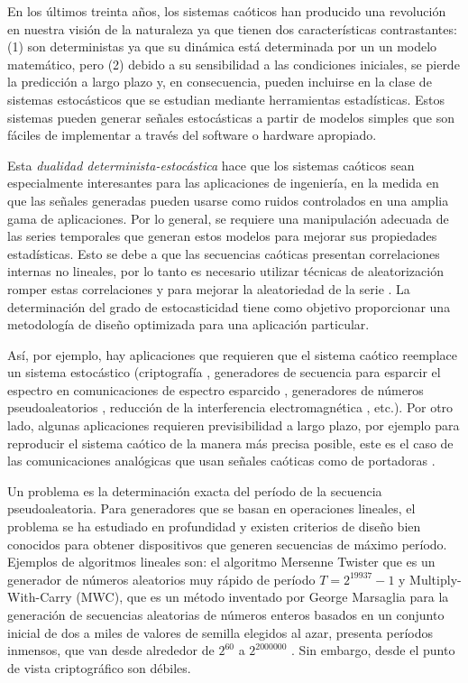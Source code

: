 En los últimos treinta años, los sistemas caóticos han producido una revolución en nuestra visión de la naturaleza ya que tienen dos características contrastantes:
(1) son deterministas ya que su dinámica está determinada por un un modelo matemático, pero
(2) debido a su sensibilidad a las condiciones iniciales, se pierde la predicción a largo plazo y, en consecuencia, pueden incluirse en la clase de sistemas estocásticos que se estudian mediante herramientas estadísticas.
Estos sistemas pueden generar señales estocásticas a partir de modelos simples que son fáciles de implementar a través del software o hardware apropiado.

Esta \emph{dualidad determinista-estocástica} hace que los sistemas caóticos sean especialmente interesantes para las aplicaciones de ingeniería, en la medida en que las señales generadas pueden usarse como ruidos controlados en una amplia gama de aplicaciones.
Por lo general, se requiere una manipulación adecuada de las series temporales que generan estos modelos para mejorar sus propiedades estadísticas.
Esto se debe a que las secuencias caóticas presentan correlaciones internas no lineales, por lo tanto es necesario utilizar técnicas de aleatorización romper estas correlaciones y para mejorar la aleatoriedad de la serie \cite{DeMicco2008}.
La determinación del grado de estocasticidad tiene como objetivo proporcionar una metodología de diseño optimizada para una aplicación particular.

Así, por ejemplo, hay aplicaciones que requieren que el sistema caótico reemplace un sistema estocástico (criptografía \cite{Fernandez2003}, generadores de secuencia para esparcir el espectro en comunicaciones de espectro esparcido \cite{Setti2004, DeMicco2007B}, generadores de números pseudoaleatorios \cite{Kocarev2003, Larrondo2006, DeMicco2009}, reducción de la interferencia electromagnética \cite{Callegari2003A}, etc.).
Por otro lado, algunas aplicaciones requieren previsibilidad a largo plazo, por ejemplo para reproducir el sistema caótico de la manera más precisa posible, este es el caso de las comunicaciones analógicas que usan señales caóticas como de portadoras \cite{Kocarev1995, Hidalgo2001}.

Un problema es la determinación exacta del período de la secuencia pseudoaleatoria.
Para generadores que se basan en operaciones lineales, el problema se ha estudiado en profundidad y existen criterios de diseño bien conocidos para obtener dispositivos que generen secuencias de máximo período.
Ejemplos de algoritmos lineales son: el algoritmo Mersenne Twister que es un generador de números aleatorios muy rápido de período $T = 2^{19937} - 1$ \cite{Matsumoto1998} y Multiply-With-Carry (MWC), que es un método inventado por George Marsaglia para la generación de secuencias aleatorias de números enteros basados en un conjunto inicial de dos a miles de valores de semilla elegidos al azar, presenta períodos inmensos, que van desde alrededor de $2 ^ {60}$ a $2 ^ {2000000}$ \cite{Marsaglia1991}.
Sin embargo, desde el punto de vista criptográfico son débiles.

